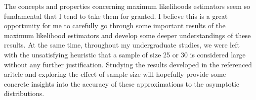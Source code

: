 \documentclass[]{STAT_547C}
\begin{document}
The concepts and properties concerning maximum likelihoods estimators seem so fundamental that I tend to take them for granted. I believe this is a great opportunity for me to carefully go through some important results of the maximum likelihood estimators and develop some deeper understandings of these results. At the same time, throughout my undergraduate studies, we were left with the unsatisfying heuristic that a sample of size 25 or 30 is considered large without any further justification. Studying the results developed in the referenced aritcle and exploring the effect of sample size will hopefully provide some concrete insights into the accuracy of these approximations to the asymptotic distributions.

\printbibliography
\end{document}
